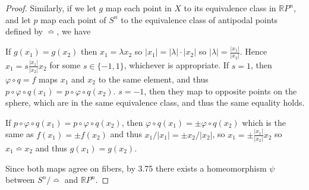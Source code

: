 \documentclass{article}
\theoremstyle{definition}
\newcommand{\R}{\mathbb{R}}
\begin{document}
\begin{proof}
Similarly, if we let $g$ map each point in $X$ to its equivalence class
in $\R P^n$, and let $p$ map each point of $S^n$ to the equivalence class
of antipodal points defined by $\bumpeq$, we have 
{\begin{center}
\end{center}}
If $g(x_1) = g(x_2)$ then $x_1 = \lambda x_2$ so 
$|x_1| = |\lambda| \cdot |x_2|$ so $|\lambda| = \frac{|x_1|}{|x_2|}$. 
Hence $x_1 = s\frac{|x_1|}{|x_2|} x_2$ for some $s \in \{-1,1\}$, whichever
is appropriate. If $s=1$, then $\varphi \circ q = f$ maps $x_1$ and $x_2$
to the same element, and thus 
$p \circ \varphi \circ q (x_1) = p \circ \varphi \circ q (x_2)$. $s=-1$, then
they map to opposite points on the sphere, which are in the same equivalence
class, and thus the same equality holds. 

If $p \circ \varphi \circ q (x_1) = p \circ \varphi \circ q (x_2)$, then 
$\varphi \circ q (x_1) = \pm \varphi \circ q (x_2)$ which is the same
as $f (x_1) = \pm f(x_2)$ and thus $x_1/|x_1| = \pm x_2 / |x_2|$, so 
$x_1 = \pm \frac{|x_1|}{|x_2|} x_2$ so $x_1 \bumpeq x_2$ and thus
$g(x_1) = g(x_2)$.

Since both maps agree on fibers, by 3.75 there exists a homeomorphism 
$\psi$ between $S^n / \bumpeq$ and $\R P^n$.
\end{proof}
\end{document}
